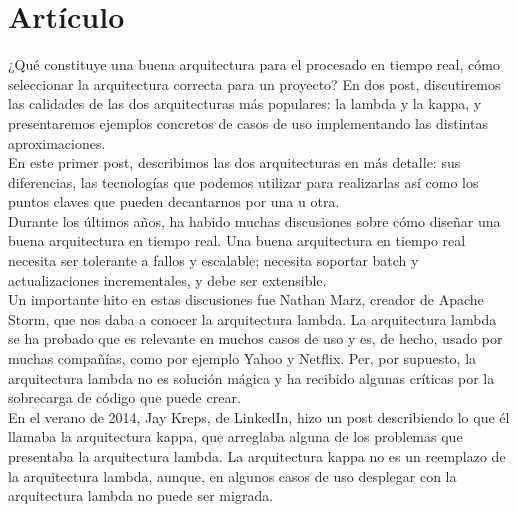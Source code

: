 \documentclass[12pt,a4paper,twoside,openright,titlepage,final]{article}
\author{José Ignacio Escribano}
\title{}
\begin{document}
\setcounter{page}{1}


\tableofcontents
\thispagestyle{empty}
\newpage

\setcounter{page}{1}

\section{Artículo}

¿Qué constituye una buena arquitectura para el procesado en tiempo real, cómo seleccionar la arquitectura correcta para un proyecto? En dos post, discutiremos las calidades de las dos arquitecturas más populares: la lambda y la kappa, y presentaremos ejemplos concretos de casos de uso implementando las distintas aproximaciones.\\

En este primer post, describimos las dos arquitecturas en más detalle: sus diferencias, las tecnologías que podemos utilizar para realizarlas así como los puntos claves que pueden decantarnos por una u otra.\\

Durante los últimos años, ha habido muchas discusiones sobre cómo diseñar una buena arquitectura en tiempo real. Una buena arquitectura en tiempo real necesita ser tolerante a fallos y escalable; necesita soportar batch y actualizaciones incrementales, y debe ser extensible.\\

Un importante hito en estas discusiones fue Nathan Marz, creador de Apache Storm, que nos daba a conocer la arquitectura lambda. La arquitectura lambda se ha probado que es relevante en muchos casos de uso y es, de hecho, usado por muchas compañías, como por ejemplo Yahoo y Netflix. Per, por supuesto, la arquitectura lambda no es solución mágica y ha recibido algunas críticas por la sobrecarga de código que puede crear.\\

En el verano de 2014, Jay Kreps, de LinkedIn, hizo un post describiendo lo que él llamaba la arquitectura kappa, que arreglaba alguna de los problemas que presentaba la arquitectura lambda. La arquitectura kappa no es un reemplazo de la arquitectura lambda, aunque, en algunos casos de uso desplegar con la arquitectura lambda no puede ser migrada.\\
\end{document}
